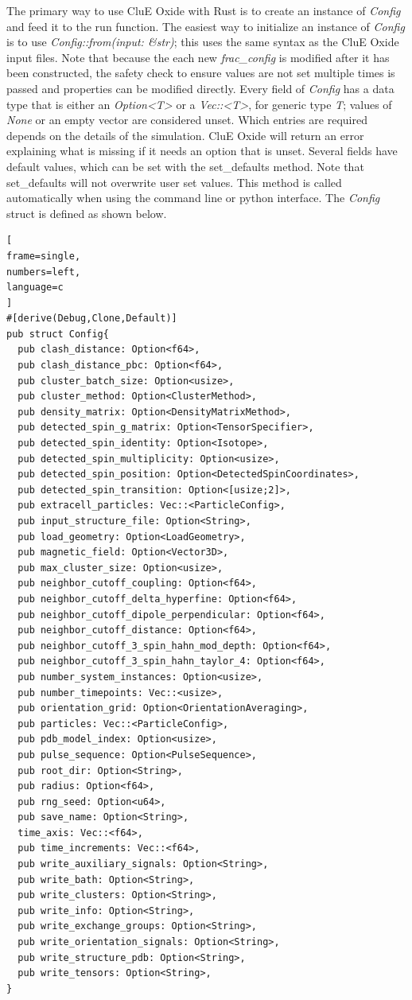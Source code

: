 \documentclass{book}
\begin{document}
%
The primary way to use CluE Oxide with Rust is to create an instance of 
\textit{Config} and feed it to the run function.
The easiest way to initialize an instance of \textit{Config} is to use 
\textit{Config::from(input: \&str)}; this uses the same syntax as the 
CluE Oxide input files. 
Note that because the each new \textit{frac\_config} is modified after it
has been constructed, the safety check to ensure values are not set multiple 
times is passed and properties can be modified directly.
Every field of \textit{Config} has a data type that is either an 
\textit{Option<T>} or a \textit{Vec::<T>}, for generic type \textit{T}; 
values of \textit{None} or an empty vector are considered unset.
Which entries are required depends on the details of the simulation.
CluE Oxide will return an error explaining what is missing if it needs an option that
is unset.  Several fields have default values, which can be set with the
set\_defaults method.  
Note that set\_defaults will not overwrite user set values.  
This method is called automatically when using the command line or python
interface.
The \textit{Config} struct is defined as shown below.
\begin{lstlisting}[
frame=single,
numbers=left,
language=c
]
#[derive(Debug,Clone,Default)]
pub struct Config{
  pub clash_distance: Option<f64>,
  pub clash_distance_pbc: Option<f64>,
  pub cluster_batch_size: Option<usize>,
  pub cluster_method: Option<ClusterMethod>,
  pub density_matrix: Option<DensityMatrixMethod>,
  pub detected_spin_g_matrix: Option<TensorSpecifier>,
  pub detected_spin_identity: Option<Isotope>,
  pub detected_spin_multiplicity: Option<usize>,
  pub detected_spin_position: Option<DetectedSpinCoordinates>,
  pub detected_spin_transition: Option<[usize;2]>,
  pub extracell_particles: Vec::<ParticleConfig>,
  pub input_structure_file: Option<String>,
  pub load_geometry: Option<LoadGeometry>,
  pub magnetic_field: Option<Vector3D>,
  pub max_cluster_size: Option<usize>,
  pub neighbor_cutoff_coupling: Option<f64>,
  pub neighbor_cutoff_delta_hyperfine: Option<f64>,
  pub neighbor_cutoff_dipole_perpendicular: Option<f64>,
  pub neighbor_cutoff_distance: Option<f64>,
  pub neighbor_cutoff_3_spin_hahn_mod_depth: Option<f64>,
  pub neighbor_cutoff_3_spin_hahn_taylor_4: Option<f64>,
  pub number_system_instances: Option<usize>,
  pub number_timepoints: Vec::<usize>,
  pub orientation_grid: Option<OrientationAveraging>,
  pub particles: Vec::<ParticleConfig>,
  pub pdb_model_index: Option<usize>,
  pub pulse_sequence: Option<PulseSequence>,
  pub root_dir: Option<String>,
  pub radius: Option<f64>,
  pub rng_seed: Option<u64>,
  pub save_name: Option<String>,
  time_axis: Vec::<f64>,
  pub time_increments: Vec::<f64>,
  pub write_auxiliary_signals: Option<String>, 
  pub write_bath: Option<String>,
  pub write_clusters: Option<String>,
  pub write_info: Option<String>,
  pub write_exchange_groups: Option<String>,
  pub write_orientation_signals: Option<String>,
  pub write_structure_pdb: Option<String>,
  pub write_tensors: Option<String>,
}
\end{lstlisting}
\printbibliography
\end{document}

